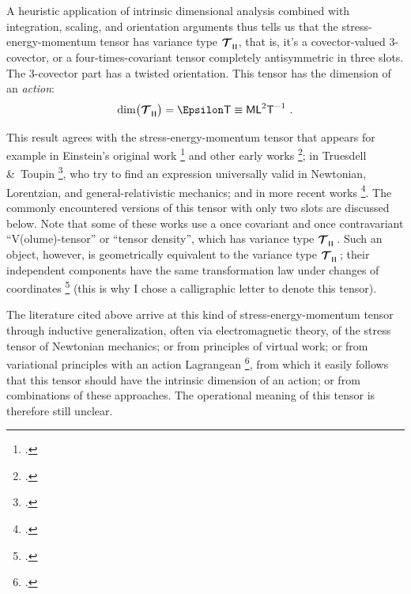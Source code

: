 \documentclass[\ifafour a4paper,12pt,\else a5paper,10pt,\fi%
onecolumn,oneside,article,%
british%
]{memoir}
\makeatletter
\theoremstyle{remark}
\theoremstyle{innote}
\newcommand*{\mathte}[1]{\textbf{\textit{\textsf{#1}}}}
\newcommand*{\citep}{\footcites}
\newcommand*{\amp}{\&}
\renewcommand*{\|}[1][]{\nonscript\,#1\vert\nonscript\;\mathopen{}}
\newcommand*{\sect}{\S}%
\newcommand*{\chap}{ch.}%
\newcommand*{\eqn}{eq.}%
\newcommand*{\eg}{{e.g.}}
\newcommand*{\cf}{{cf.}}
\newcommand*{\q}{}%
\DeclareRobustCommand*{\q}{%
  \mathord{\mathpalette\bigcdot@{}}%
}
\newcommand*{\bigcdot@scalefactor}{0.7}
\newcommand*{\bigcdot@widthfactor}{1.5}
\newcommand*{\bigcdot@}[2]{%
  \sbox0{$#1\vcenter{}$}%
  \sbox2{$#1\cdot\m@th$}%
  \hbox to \bigcdot@widthfactor\wd2{%
    \hfil
    \raise\ht0\hbox{%
      \scalebox{\bigcdot@scalefactor}{%
        \lower\ht0\hbox{$#1\bullet\m@th$}%
      }%
    }%
    \hfil
  }%
}
\newcommand*{\Le}{\textsf{L}}
\newcommand*{\Ti}{\textsf{T}}
\newcommand*{\Ma}{\textsf{M}}
\newcommand*{\En}{\Epsilon}%
\newcommand*{\yT}{\bm{\mathcal{T}}}
\renewcommand*{\i}{\indices}
\newcommand*{\rul}{{\mkern2mu\rule[-0.1ex]{0.75pt}{1.1ex}\mkern2mu}}
\DeclarePairedDelimiter\mul{\rul}{\rul}%
\makeatother
\begin{document}
\medskip

A heuristic application of intrinsic dimensional analysis combined with
integration, scaling, and orientation arguments thus tells us that the
stress-energy-momentum tensor has variance type $\yT\i{_{\q\mul{\q\q\q}}}$,
that is, it's a covector-valued 3-covector, or a four-times-covariant
tensor completely antisymmetric in three slots. The 3-covector part has a
twisted orientation. This tensor has the dimension of an \emph{action}:
\begin{equation}
    \label{eq:final_dim_T}
  \dim\bigl(\yT\i{_{\q \mul{\q\q\q}}}\bigr) = \En\Ti \equiv \Ma\Le^{2}\Ti^{-1} \ .
\end{equation}

\medskip

This result agrees with the stress-energy-momentum tensor that appears for
example in Einstein's original work \citep[\sect~C.9, discussion before
\eqn~(42a)]{einstein1914b} and other early works
\citep[\eg][\sect~IV.54]{pauli1921_t1958}[\sect~13]{cartan1923}[\sect~7]{brillouin1924};
in Truesdell \amp\ Toupin \citep[\sect~F.IV.288]{truesdelletal1960}, who
try to find an expression universally valid in Newtonian, Lorentzian, and
general-relativistic mechanics; and in more recent works
\citep[\sect~VIII.3]{fokker1960_t1965}[\chap~14 Exercise~14.18, \chap~15,
\sect~21.3]{misneretal1970_r1973}{hehletal1986,gotayetal1992,gronwaldetal1997,castrillonlopezetal2008,castrillonlopezetal2009}[see
also][for similar conclusions in general manifolds and in Newtonian
mechanics]{segevetal1999,kansoetal2007}. The commonly encountered versions
of this tensor with only two slots are discussed below.
Note that some of these works use a once covariant and once contravariant
\enquote{V(olume)-tensor} or \enquote{tensor density}, which has variance
type $\yT\i{_{\q}^{\q}_{\mul{\q\q\q\q}}}\,$. Such an object, however, is
geometrically equivalent to the variance type $\yT\i{_{\q \mul{\q\q\q}}}\,$;
their independent components have the same transformation law under changes
of coordinates \citep[\sect~II.8 p.~30]{schouten1951_r1989} (this is why I
chose a calligraphic letter to denote this tensor). %

The literature cited above arrive at this kind of stress-energy-momentum
tensor through inductive generalization, often via electromagnetic theory,
of the stress tensor of Newtonian mechanics; or from principles of virtual
work; or from variational principles with an action Lagrangean \citep[\cf\
also][]{hilbert1915,hilbert1917}[\sect~3.3]{hawkingetal1973_r1994}, from
which it easily follows that this tensor should have the intrinsic
dimension of an action; or from combinations of these approaches. The
operational meaning of this tensor is therefore still unclear.
\end{document}

